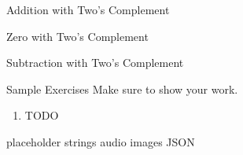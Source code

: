 \begin{frame}{Addition with Two's Complement}
\end{frame}

\begin{frame}{Zero with Two's Complement}
\end{frame}

\begin{frame}{Subtraction with Two's Complement}
\end{frame}

\begin{frame}{Sample Exercises}
Make sure to show your work.
\vfill 
\begin{enumerate}
    \item TODO
    \vfill 
\end{enumerate}
\end{frame}




\begin{frame}{placeholder}
    strings
    audio
    images
    JSON
\end{frame}
    
